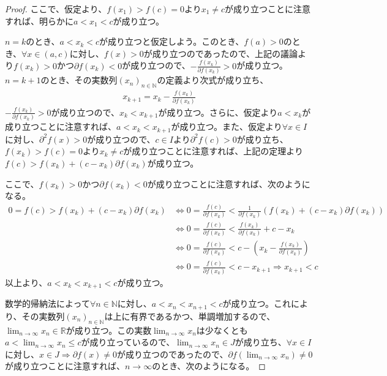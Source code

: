 \documentclass[dvipdfmx]{jsarticle}
\begin{document}
\begin{proof}
ここで、仮定より、$f\left( x_{1} \right) > f(c) = 0$より$x_{1} \neq c$が成り立つことに注意すれば、明らかに$a < x_{1} < c$が成り立つ。\par
$n = k$のとき、$a < x_{k} < c$が成り立つと仮定しよう。このとき、$f(a) > 0$のとき、$\forall x \in (a,c)$に対し、$f(x) > 0$が成り立つのであったので、上記の議論より$f\left( x_{k} \right) > 0$かつ$\partial f\left( x_{k} \right) < 0$が成り立つので、$- \frac{f\left( x_{k} \right)}{\partial f\left( x_{k} \right)} > 0$が成り立つ。$n = k + 1$のとき、その実数列$\left( x_{n} \right)_{n \in \mathbb{N}}$の定義より次式が成り立ち、
\begin{align*}
x_{k + 1} = x_{k} - \frac{f\left( x_{k} \right)}{\partial f\left( x_{k} \right)}
\end{align*}
$- \frac{f\left( x_{k} \right)}{\partial f\left( x_{k} \right)} > 0$が成り立つので、$x_{k} < x_{k + 1}$が成り立つ。さらに、仮定より$a < x_{k}$が成り立つことに注意すれば、$a < x_{k} < x_{k + 1}$が成り立つ。また、仮定より$\forall x \in I$に対し、$\partial^{2}f(x) > 0$が成り立つので、$c \in I$より$\partial^{2}f(c) > 0$が成り立ち、$f\left( x_{k} \right) > f(c) = 0$より$x_{k} \neq c$が成り立つことに注意すれば、上記の定理より$f(c) > f\left( x_{k} \right) + \left( c - x_{k} \right)\partial f\left( x_{k} \right)$が成り立つ。\par
ここで、$f\left( x_{k} \right) > 0$かつ$\partial f\left( x_{k} \right) < 0$が成り立つことに注意すれば、次のようになる。
\begin{align*}
0 = f(c) > f\left( x_{k} \right) + \left( c - x_{k} \right)\partial f\left( x_{k} \right) &\Leftrightarrow 0 = \frac{f(c)}{\partial f\left( x_{k} \right)} < \frac{1}{\partial f\left( x_{k} \right)}\left( f\left( x_{k} \right) + \left( c - x_{k} \right)\partial f\left( x_{k} \right) \right)\\
&\Leftrightarrow 0 = \frac{f(c)}{\partial f\left( x_{k} \right)} < \frac{f\left( x_{k} \right)}{\partial f\left( x_{k} \right)} + c - x_{k}\\
&\Leftrightarrow 0 = \frac{f(c)}{\partial f\left( x_{k} \right)} < c - \left( x_{k} - \frac{f\left( x_{k} \right)}{\partial f\left( x_{k} \right)} \right)\\
&\Leftrightarrow 0 = \frac{f(c)}{\partial f\left( x_{k} \right)} < c - x_{k + 1} \Rightarrow x_{k + 1} < c
\end{align*}
以上より、$a < x_{k} < x_{k + 1} < c$が成り立つ。\par
数学的帰納法によって$\forall n \in \mathbb{N}$に対し、$a < x_{n} < x_{n + 1} < c$が成り立つ。これにより、その実数列$\left( x_{n} \right)_{n \in \mathbb{N}}$は上に有界であるかつ、単調増加するので、$\lim_{n \rightarrow \infty}x_{n} \in \mathbb{R}$が成り立つ。この実数$\lim_{n \rightarrow \infty}x_{n}$は少なくとも$a < \lim_{n \rightarrow \infty}x_{n} \leq c$が成り立っているので、$\lim_{n \rightarrow \infty}x_{n} \in J$が成り立ち、$\forall x \in I$に対し、$x \in J \Rightarrow \partial f(x) \neq 0$が成り立つのであったので、$\partial f\left( \lim_{n \rightarrow \infty}x_{n} \right) \neq 0$が成り立つことに注意すれば、$n \rightarrow \infty$のとき、次のようになる。

\end{proof}
\end{document}
